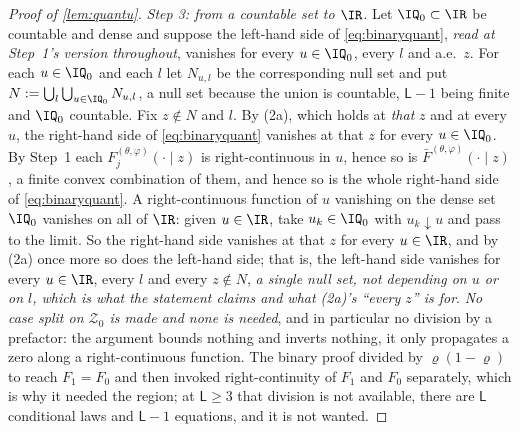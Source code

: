\begin{proof}[Proof of \cref{lem:quantu}]
\emph{Step 3: from a countable set to $\IR$.}
Let $\IQ_0\subset\IR$ be countable and dense and suppose the left-hand side of
\eqref{eq:binaryquant}, \emph{read at Step~1's version throughout}, vanishes for every $u\in\IQ_0$,
every $l$ and a.e.\ $z$. For each $u\in\IQ_0$ and
each $l$ let $N_{u,l}$ be the corresponding null set and put
$N:=\bigcup_{l}\bigcup_{u\in\IQ_0}N_{u,l}$, a null set because the union is countable, $\mathsf L-1$
being finite and $\IQ_0$ countable. Fix $z\notin N$ and $l$. By (2a), which holds at \emph{that} $z$ and
at every $u$, the right-hand side of \eqref{eq:binaryquant} vanishes at that $z$ for every $u\in\IQ_0$.
By Step~1 each $F_j^{(\theta,\varphi)}(\cdot\mid z)$ is
right-continuous in $u$, hence so is $\bar F^{(\theta,\varphi)}(\cdot\mid z)$, a finite convex
combination of them, and hence so is the whole right-hand side of \eqref{eq:binaryquant}. A
right-continuous function of $u$ vanishing on the dense set $\IQ_0$ vanishes on all of $\IR$: given
$u\in\IR$, take $u_k\in\IQ_0$ with $u_k\downarrow u$ and pass to the limit. So the right-hand side
vanishes at that $z$ for every $u\in\IR$, and by (2a) once more so does the left-hand side; that is, the
left-hand side vanishes for every $u\in\IR$, every $l$ and every $z\notin N$, \emph{a single null set,
not depending on $u$ or on $l$, which is what the statement claims and what (2a)'s ``every $z$'' is for}.
\emph{No case split on $\mathcal Z_0$ is made and none is needed}, and in particular no division by a
prefactor: the argument bounds nothing and inverts nothing, it only propagates a zero along a
right-continuous function. The binary proof divided by $\varrho(1-\varrho)$ to reach
$F_1=F_0$ and then invoked right-continuity of $F_1$ and $F_0$ separately, which is why it needed the
region; at $\mathsf L\ge3$ that division is not available, there are $\mathsf L$ conditional laws and
$\mathsf L-1$ equations, and it is not wanted.
\end{proof}

